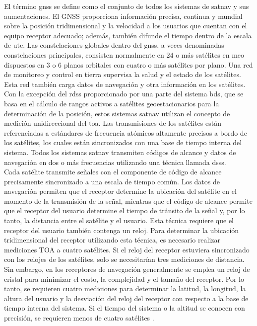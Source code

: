 \begin{justify}
    El término \gls{gnss} se define como el conjunto de todos los sistemas de \gls{satnav} y sus aumentaciones. El GNSS proporciona información precisa, continua y mundial
    sobre la posición tridimensional y la velocidad a los usuarios que cuentan con el equipo receptor adecuado; además, también difunde el tiempo dentro de la escala de \gls{utc}.
    Las constelaciones globales dentro del \gls{gnss}, a veces denominadas constelaciones principales, consisten normalmente en 24 o más satélites en \gls{meo} dispuestos
    en 3 o 6 planos orbitales con cuatro o más satélites por plano. Una red de monitoreo y control en tierra supervisa la salud y el estado de los satélites.
    Esta red también carga datos de navegación y otra información en los satélites.\\

    Con la excepción del \gls{rdss} proporcionado por una parte del sistema \gls{bds}, que se basa en el cálculo de rangos activos a satélites geoestacionarios para la determinación
    de la posición, estos sistemas \gls{satnav} utilizan el concepto de medición unidireccional del \gls{toa}. Las transmisiones de los satélites están referenciadas a estándares
    de frecuencia atómicos altamente precisos a bordo de los satélites, los cuales están sincronizados con una base de tiempo interna del sistema. Todos los sistemas
    \gls{satnav} transmiten códigos de alcance y datos de navegación en dos o más frecuencias utilizando una técnica llamada \gls{dsss}.\\

    Cada satélite transmite señales con el componente de código de alcance precisamente sincronizado a una escala de tiempo común. Los datos de navegación permiten que el
    receptor determine la ubicación del satélite en el momento de la transmisión de la señal, mientras que el código de alcance permite que el receptor del usuario determine
    el tiempo de tránsito de la señal y, por lo tanto, la distancia entre el satélite y el usuario. Esta técnica requiere que el receptor del usuario también contenga un reloj.
    Para determinar la ubicación tridimensional del receptor utilizando esta técnica, es necesario realizar mediciones TOA a cuatro satélites. Si el reloj del receptor
    estuviera sincronizado con los relojes de los satélites, solo se necesitarían tres mediciones de distancia. Sin embargo, en los receptores de navegación generalmente
    se emplea un reloj de cristal para minimizar el costo, la complejidad y el tamaño del receptor. Por lo tanto, se requieren cuatro mediciones para determinar la latitud,
    la longitud, la altura del usuario y la desviación del reloj del receptor con respecto a la base de tiempo interna del sistema. Si el tiempo del sistema o la altitud se
    conocen con precisión, se requieren menos de cuatro satélites \parencite{kaplan2017understanding}.
\end{justify}

